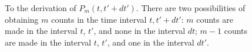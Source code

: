 \begin{figure}
\centering



\caption{To the derivation of $P_m\left(t, t' + dt'\right)$. There are two possibilities of obtaining $m$ counts in the time interval $t, t' + dt'$: $m$ counts are made in the interval $t$, $t'$, and none in the interval $dt$; $m - 1$ counts are made in the interval $t$, $t'$, and one in the interval $dt'$.}
\label{figPart4Ch2_5}
\end{figure}